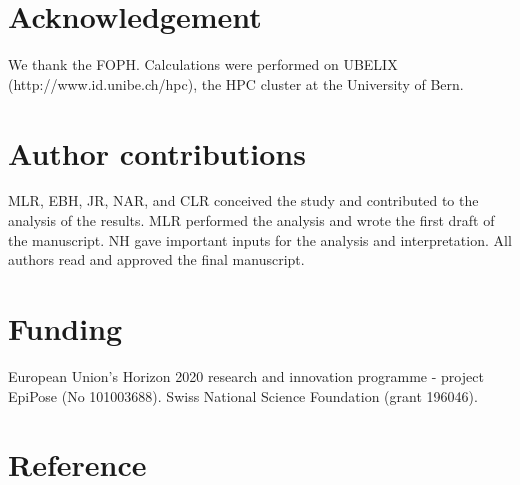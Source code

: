 \documentclass[10pt, a4paper, twoside]{article}
\begin{document}
\begin{multicols}{2}
\section{Acknowledgement}
We thank the FOPH. Calculations were performed on UBELIX (http://www.id.unibe.ch/hpc), the HPC cluster at the University of Bern.

\section{Author contributions}
MLR, EBH, JR, NAR, and CLR conceived the study and contributed to the analysis of the results.
MLR performed the analysis and wrote the first draft of the manuscript.
NH gave important inputs for the analysis and interpretation.
All authors read and approved the final manuscript.

\section{Funding}
European Union’s Horizon 2020 research and innovation programme - project EpiPose (No 101003688). Swiss National Science Foundation (grant 196046).

\section{Reference}



\end{multicols}
\end{document}
